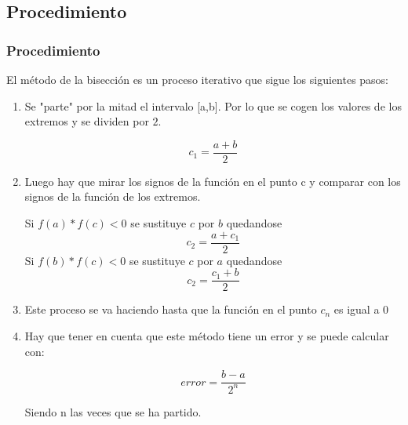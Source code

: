 \documentclass{beamer}
\begin{document}
\subsection{Procedimiento}
\begin{frame}
\frametitle{Procedimiento}
El método de la bisección es un proceso iterativo que sigue los siguientes pasos:
\begin{enumerate}
 \item
  Se "parte" por la mitad el intervalo [a,b]. Por lo que se cogen los valores de los extremos y se dividen por $2$.
  \begin{center}
   $$ c_1=\frac{a+b}{2} $$
  \end{center}
 \pause

 \item
  Luego hay que mirar los signos de la función en el punto c y comparar con los signos de la función de los extremos.
   \begin{enumerate}
    \Item
     Si $f(a)*f(c)<0$ se sustituye $c$ por $b$ quedandose $$c_2=\frac{a+c_1}{2}$$
    \Item
     Si $f(b)*f(c)<0$ se sustituye $c$ por $a$ quedandose $$c_2=\frac{c_1+b}{2}$$
   \end{enumerate}
 \pause
 \item
  Este proceso se va haciendo hasta que la función en el punto $c_n$ es igual a $0$
 \pause
 \item
  Hay que tener en cuenta que este método tiene un error y se puede calcular con:
  \begin{center}
   $$ error=\frac{b-a}{2^n} $$ 
  \end{center} 
  Siendo n las veces que se ha partido.
 \pause
 
\end{enumerate}
\end{frame}
\end{document}
